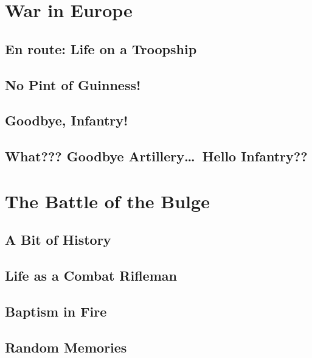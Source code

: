 \part{War in Europe}\label{war-in-europe}
\chapter{En route: Life on a Troopship}\label{en-route}


\chapter{No Pint of Guinness!}\label{no-pint-of-guinness}


\chapter{Goodbye, Infantry!}\label{goodbye-infantry}


\chapter{What??? Goodbye Artillery\ldots\ Hello Infantry??}\label{goodbye-artillery}


\part{The Battle of the Bulge}\label{battle-of-the-bulge}
\chapter{A Bit of History}\label{bit-of-history}


\chapter{Life as a Combat Rifleman}\label{life-as-a-combat-rifleman}


\chapter{Baptism in Fire}\label{baptism-in-fire}


\chapter{Random Memories}\label{random-memories}


